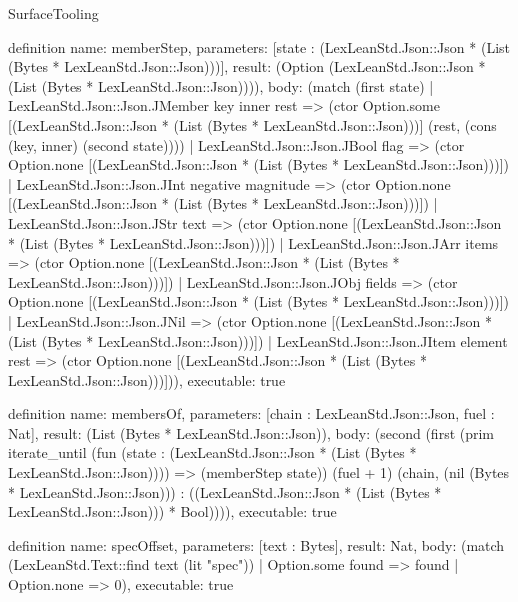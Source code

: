 \begin{lexlean}{SurfaceTooling}
\begin{semanticmodule}
definition{
  name: memberStep,
  parameters: [state : (LexLeanStd.Json::Json * (List (Bytes * LexLeanStd.Json::Json)))],
  result: (Option (LexLeanStd.Json::Json * (List (Bytes * LexLeanStd.Json::Json)))),
  body: (match (first state)
    | LexLeanStd.Json::Json.JMember key inner rest => (ctor Option.some [(LexLeanStd.Json::Json * (List (Bytes * LexLeanStd.Json::Json)))] (rest, (cons (key, inner) (second state))))
    | LexLeanStd.Json::Json.JBool flag => (ctor Option.none [(LexLeanStd.Json::Json * (List (Bytes * LexLeanStd.Json::Json)))])
    | LexLeanStd.Json::Json.JInt negative magnitude => (ctor Option.none [(LexLeanStd.Json::Json * (List (Bytes * LexLeanStd.Json::Json)))])
    | LexLeanStd.Json::Json.JStr text => (ctor Option.none [(LexLeanStd.Json::Json * (List (Bytes * LexLeanStd.Json::Json)))])
    | LexLeanStd.Json::Json.JArr items => (ctor Option.none [(LexLeanStd.Json::Json * (List (Bytes * LexLeanStd.Json::Json)))])
    | LexLeanStd.Json::Json.JObj fields => (ctor Option.none [(LexLeanStd.Json::Json * (List (Bytes * LexLeanStd.Json::Json)))])
    | LexLeanStd.Json::Json.JNil => (ctor Option.none [(LexLeanStd.Json::Json * (List (Bytes * LexLeanStd.Json::Json)))])
    | LexLeanStd.Json::Json.JItem element rest => (ctor Option.none [(LexLeanStd.Json::Json * (List (Bytes * LexLeanStd.Json::Json)))])),
  executable: true
}

definition{
  name: membersOf,
  parameters: [chain : LexLeanStd.Json::Json, fuel : Nat],
  result: (List (Bytes * LexLeanStd.Json::Json)),
  body: (second (first (prim iterate_until (fun (state : (LexLeanStd.Json::Json * (List (Bytes * LexLeanStd.Json::Json)))) => (memberStep state)) (fuel + 1) (chain, (nil (Bytes * LexLeanStd.Json::Json))) : ((LexLeanStd.Json::Json * (List (Bytes * LexLeanStd.Json::Json))) * Bool)))),
  executable: true
}

definition{
  name: specOffset,
  parameters: [text : Bytes],
  result: Nat,
  body: (match (LexLeanStd.Text::find text (lit "spec"))
    | Option.some found => found
    | Option.none => 0),
  executable: true
}


\end{semanticmodule}
\end{lexlean}
